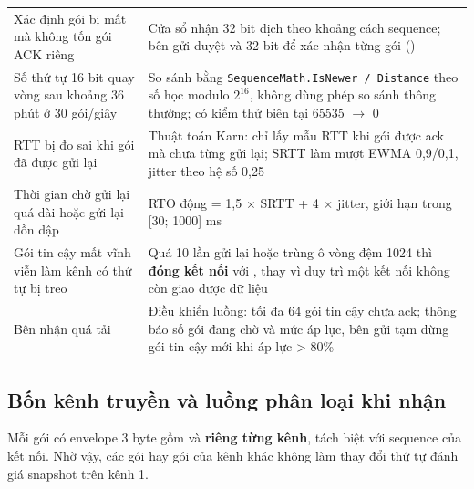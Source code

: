 \begin{center}\small
\begin{tabularx}{\linewidth}{|L{4.2cm}|Y|}
\hline
{} &  \\ \hline
Xác định gói bị mất mà không tốn gói ACK riêng & Cửa sổ nhận 32 bit dịch theo khoảng cách sequence; bên gửi duyệt  và 32 bit để xác nhận từng gói () \\ \hline
Số thứ tự 16 bit quay vòng sau khoảng 36 phút ở 30 gói/giây & So sánh bằng \texttt{SequenceMath.IsNewer / Distance} theo số học modulo $2^{16}$, không dùng phép so sánh thông thường; có kiểm thử biên tại 65535 $\rightarrow$ 0 \\ \hline
RTT bị đo sai khi gói đã được gửi lại & Thuật toán Karn: chỉ lấy mẫu RTT khi gói được ack mà chưa từng gửi lại; SRTT làm mượt EWMA 0,9/0,1, jitter theo hệ số 0,25 \\ \hline
Thời gian chờ gửi lại quá dài hoặc gửi lại dồn dập & RTO động = 1,5 $\times$ SRTT + 4 $\times$ jitter, giới hạn trong [30; 1000] ms \\ \hline
Gói tin cậy mất vĩnh viễn làm kênh có thứ tự bị treo & Quá 10 lần gửi lại hoặc trùng ô vòng đệm 1024 thì \textbf{đóng kết nối} với , thay vì duy trì một kết nối không còn giao được dữ liệu \\ \hline
Bên nhận quá tải & Điều khiển luồng: tối đa 64 gói tin cậy chưa ack;  thông báo số gói đang chờ và mức áp lực, bên gửi tạm dừng gói tin cậy mới khi áp lực > 80\% \\ \hline
\end{tabularx}
\end{center}

\subsection{Bốn kênh truyền và luồng phân loại khi nhận}\label{sec:B-kenh}
Mỗi gói  có envelope 3 byte gồm  và  \textbf{riêng từng kênh},
tách biệt với sequence của kết nối. Nhờ vậy, các gói  hay gói của kênh khác không làm thay đổi thứ tự
đánh giá snapshot trên kênh 1.

